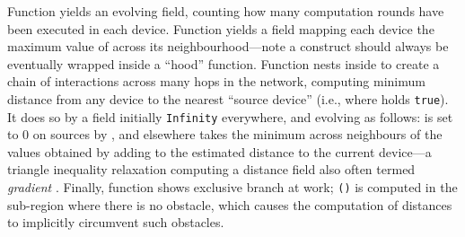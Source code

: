 \documentclass[12pt,a4paper,twoside,openright]{book}
\begin{document}
Function \texttt{} yields an evolving field, counting how many computation rounds have been executed in each device.
%
Function \texttt{} yields a field mapping each device the maximum value of \texttt{} across its neighbourhood---note a \nbrK{} construct should always be eventually wrapped inside a ``hood'' function.
%
Function \texttt{} nests \nbrK{} inside \texttt{} to create a chain of interactions across many hops in the network, computing minimum distance from any device to the nearest ``source device'' (i.e., where \texttt{} holds \texttt{true}).
%
It does so by a field \texttt{} initially \texttt{Infinity} everywhere, and evolving as follows: \texttt{} is set to $0$ on sources by \texttt{}, and elsewhere takes the minimum across neighbours of the values obtained by adding to \texttt{} the estimated distance to the current device---a triangle inequality relaxation computing a distance field also often termed \emph{gradient} \cite{original-gradient,crf,VCMZ-TAAS2011}.
%
Finally, function \texttt{} shows exclusive branch at work; \texttt{()} is computed in the sub-region where there is no obstacle, which causes the computation of distances to implicitly circumvent such obstacles.
\end{document}
